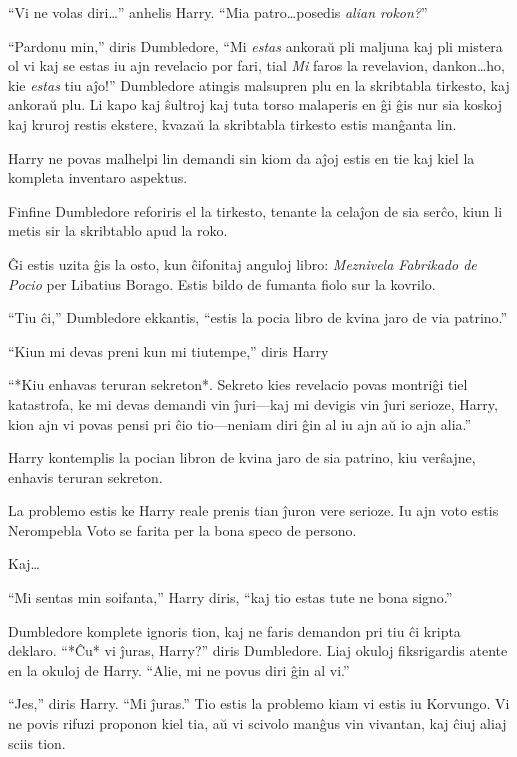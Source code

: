 ``Vi ne volas diri\ldots'' anhelis Harry. ``Mia patro\ldots posedis
\emph{alian rokon?}''

``Pardonu min,'' diris Dumbledore, ``Mi \emph{estas} ankoraŭ pli
maljuna kaj pli mistera ol vi kaj se estas iu ajn revelacio por fari,
tial \emph{Mi} faros la revelavion, dankon\ldots ho, kie \emph{estas}
tiu aĵo!'' Dumbledore atingis malsupren plu en la skribtabla tirkesto,
kaj ankoraŭ plu. Li kapo kaj ŝultroj kaj tuta torso malaperis en ĝi
ĝis nur sia koskoj kaj kruroj restis ekstere, kvazaŭ la skribtabla
tirkesto estis manĝanta lin.

Harry ne povas malhelpi lin demandi sin kiom da aĵoj estis en tie kaj
kiel la kompleta inventaro aspektus.

Finfine Dumbledore reforiris el la tirkesto, tenante la celaĵon de sia
serĉo, kiun li metis sir la skribtablo apud la roko.

Ĝi estis uzita ĝis la osto, kun ĉifonitaj anguloj libro:
\emph{Meznivela Fabrikado de Pocio} per Libatius Borago. Estis bildo
de fumanta fiolo sur la kovrilo.

``Tiu ĉi,'' Dumbledore ekkantis, ``estis la pocia libro de kvina jaro
de via patrino.''

``Kiun mi devas preni kun mi tiutempe,'' diris Harry

``*Kiu enhavas teruran sekreton*. Sekreto kies revelacio povas
montriĝi tiel katastrofa, ke mi devas demandi vin ĵuri—kaj mi devigis
vin ĵuri serioze, Harry, kion ajn vi povas pensi pri ĉio tio—neniam
diri ĝin al iu ajn aŭ io ajn alia.''

Harry kontemplis la pocian libron de kvina jaro de sia patrino, kiu
verŝajne, enhavis teruran sekreton.

La problemo estis ke Harry reale prenis tian ĵuron vere serioze. Iu ajn
voto estis Nerompebla Voto se farita per la bona speco de persono.

Kaj\ldots

``Mi sentas min soifanta,'' Harry diris, ``kaj tio estas tute ne bona signo.''

Dumbledore komplete ignoris tion, kaj ne faris demandon pri tiu ĉi
kripta deklaro. ``*Ĉu* vi ĵuras, Harry?'' diris Dumbledore. Liaj
okuloj fiksrigardis atente en la okuloj de Harry. ``Alie, mi ne povus
diri ĝin al vi.''

``Jes,'' diris Harry. ``Mi ĵuras.'' Tio estis la problemo kiam vi
estis iu Korvungo. Vi ne povis rifuzi proponon kiel tia, aŭ vi scivolo
manĝus vin vivantan, kaj ĉiuj aliaj sciis tion.

